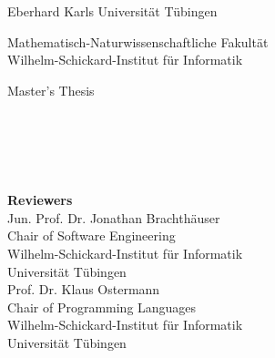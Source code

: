 
\begin{titlepage}
    \makeatletter
    \begin{center}
        \begin{LARGE}
            Eberhard Karls Universität Tübingen
        \end{LARGE}
        \begin{large}
            Mathematisch-Naturwissenschaftliche Fakultät \\
            Wilhelm-Schickard-Institut für Informatik
        \end{large}
        \vfill
        \begin{huge} 
            Master's Thesis
        \end{huge}
        \\\vspace{2cm}
        \begin{Large} \textbf{\@title} \end{Large}
        \\\vspace{1.5cm}
        \begin{large} \@author \end{large}
        \\\vspace{0.5cm}
        {\small \handindate}
        \vfill
        {\small \textbf{Reviewers}}
        \\
        \large{Jun. Prof. Dr. Jonathan Brachthäuser}\\
        \footnotesize{
            Chair of Software Engineering \\
            Wilhelm-Schickard-Institut für Informatik \\
            Universität Tübingen
        }
        \\\vspace{0.5cm}
        \large{Prof. Dr. Klaus Ostermann}\\
        \footnotesize{
            Chair of Programming Languages \\
            Wilhelm-Schickard-Institut für Informatik \\
            Universität Tübingen
        }
    \end{center}
\end{titlepage}

